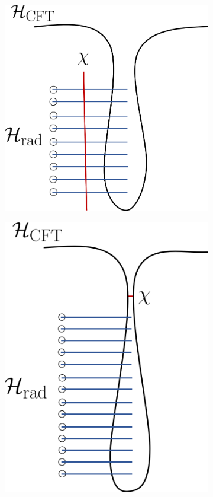 \documentclass[12pt]{article}
\begin{document}
\begin{figure}[t]
\vspace{2cm}
\begin{subfigure}{.48\textwidth}
  \centering
  \vspace{-2cm}
 \includegraphics[width = 0.8\linewidth]{Evaporation_BeforePage.png}
\end{subfigure}
\begin{subfigure}{.48\textwidth}
  \centering
  \vspace{-2cm}
 \includegraphics[width = 0.7\linewidth]{Evaporation_AfterPage.png}

\end{subfigure}
\end{figure}
\end{document}
